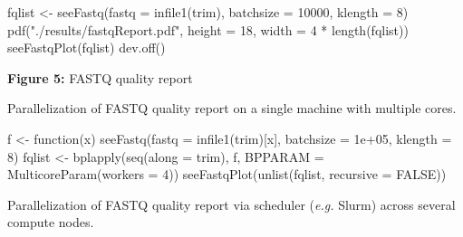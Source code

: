 \documentclass[14pt,]{article}
\newcommand{\hlnum}[1]{\textcolor[rgb]{0.816,0.125,0.439}{#1}}%
\newcommand{\hlstr}[1]{\textcolor[rgb]{0.251,0.627,0.251}{#1}}%
\newcommand{\hlstd}[1]{\textcolor[rgb]{0.251,0.251,0.251}{#1}}%
\newcommand{\hlkwd}[1]{\textcolor[rgb]{0.878,0.439,0.125}{#1}}%
\newenvironment{Shaded}{\begin{myshaded}}{\end{myshaded}}
\newcommand{\DecValTok}[1]{\hlnum{#1}}
\newcommand{\FloatTok}[1]{\hlnum{#1}}
\newcommand{\ConstantTok}[1]{\hlnum{#1}}
\newcommand{\SpecialCharTok}[1]{\hlstr{#1}}
\newcommand{\StringTok}[1]{\hlstr{#1}}
\newcommand{\OtherTok}[1]{{#1}}
\newcommand{\FunctionTok}[1]{\hlstd{#1}}
\newcommand{\ControlFlowTok}[1]{\hlkwd{#1}}
\newcommand{\AttributeTok}[1]{{#1}}
\newcommand{\NormalTok}[1]{\hlstd{#1}}
\begin{document}
\begin{Shaded}
\begin{Highlighting}[]
\NormalTok{fqlist }\OtherTok{\textless{}{-}} \FunctionTok{seeFastq}\NormalTok{(}\AttributeTok{fastq =} \FunctionTok{infile1}\NormalTok{(trim), }\AttributeTok{batchsize =} \DecValTok{10000}\NormalTok{, }\AttributeTok{klength =} \DecValTok{8}\NormalTok{)}
\FunctionTok{pdf}\NormalTok{(}\StringTok{"./results/fastqReport.pdf"}\NormalTok{, }\AttributeTok{height =} \DecValTok{18}\NormalTok{, }\AttributeTok{width =} \DecValTok{4} \SpecialCharTok{*} \FunctionTok{length}\NormalTok{(fqlist))}
\FunctionTok{seeFastqPlot}\NormalTok{(fqlist)}
\FunctionTok{dev.off}\NormalTok{()}
\end{Highlighting}
\end{Shaded}

\textbf{Figure 5:} FASTQ quality report

Parallelization of FASTQ quality report on a single machine with multiple cores.

\begin{Shaded}
\begin{Highlighting}[]
\NormalTok{f }\OtherTok{\textless{}{-}} \ControlFlowTok{function}\NormalTok{(x) }\FunctionTok{seeFastq}\NormalTok{(}\AttributeTok{fastq =} \FunctionTok{infile1}\NormalTok{(trim)[x], }\AttributeTok{batchsize =} \FloatTok{1e+05}\NormalTok{, }\AttributeTok{klength =} \DecValTok{8}\NormalTok{)}
\NormalTok{fqlist }\OtherTok{\textless{}{-}} \FunctionTok{bplapply}\NormalTok{(}\FunctionTok{seq}\NormalTok{(}\AttributeTok{along =}\NormalTok{ trim), f, }\AttributeTok{BPPARAM =} \FunctionTok{MulticoreParam}\NormalTok{(}\AttributeTok{workers =} \DecValTok{4}\NormalTok{))}
\FunctionTok{seeFastqPlot}\NormalTok{(}\FunctionTok{unlist}\NormalTok{(fqlist, }\AttributeTok{recursive =} \ConstantTok{FALSE}\NormalTok{))}
\end{Highlighting}
\end{Shaded}

Parallelization of FASTQ quality report via scheduler (\emph{e.g.} Slurm) across several compute nodes.
\end{document}
